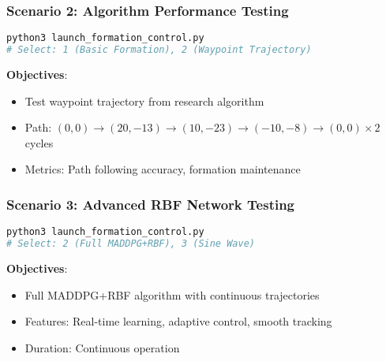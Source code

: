 \documentclass[11pt,a4paper]{article}
\begin{document}
\subsubsection{Scenario 2: Algorithm Performance Testing}

\begin{lstlisting}[language=bash, caption=Algorithm Performance Evaluation]
python3 launch_formation_control.py  
# Select: 1 (Basic Formation), 2 (Waypoint Trajectory)
\end{lstlisting}

\textbf{Objectives}:
\begin{itemize}
    \item Test waypoint trajectory from research algorithm
    \item Path: $(0,0) \rightarrow (20,-13) \rightarrow (10,-23) \rightarrow (-10,-8) \rightarrow (0,0) \times 2$ cycles
    \item Metrics: Path following accuracy, formation maintenance
\end{itemize}

\subsubsection{Scenario 3: Advanced RBF Network Testing}

\begin{lstlisting}[language=bash, caption=Advanced RBF Network Evaluation]
python3 launch_formation_control.py
# Select: 2 (Full MADDPG+RBF), 3 (Sine Wave)
\end{lstlisting}

\textbf{Objectives}:
\begin{itemize}
    \item Full MADDPG+RBF algorithm with continuous trajectories
    \item Features: Real-time learning, adaptive control, smooth tracking
    \item Duration: Continuous operation
\end{itemize}
\end{document}
